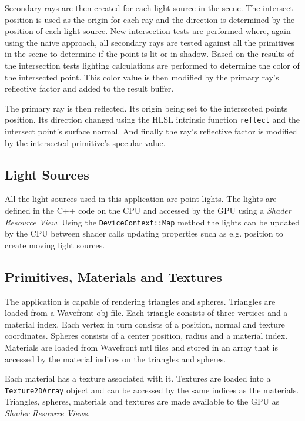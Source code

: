 \documentclass{article}
\newcommand{\code}[1]{\texttt{#1}}
\begin{document}
Secondary rays are then created for each light source in the scene. The intersect position is used as the origin for each ray and
the direction is determined by the position of each light source. New intersection tests are performed where, again using the
naive approach, all secondary rays are tested against all the primitives in the scene to determine if the point is lit or in shadow.
Based on the results of the intersection tests lighting calculations are performed to determine the color of the intersected
point. This color value is then modified by the primary ray's reflective factor and added to the result buffer.

The primary ray is then reflected. Its origin being set to the intersected points position. Its direction changed using 
the HLSL intrinsic function \code{reflect} and the intersect point's surface normal. And finally the ray's reflective factor is
modified by the intersected primitive's specular value.

\subsection{Light Sources}
All the light sources used in this application are point lights. The lights are defined in the C++ code on the CPU and
accessed by the GPU using a \textit{Shader Resource View}. Using the \code{DeviceContext::Map} method the lights can be
updated by the CPU between shader calls updating properties such as e.g. position to create moving light sources.


\subsection{Primitives, Materials and Textures}
The application is capable of rendering triangles and spheres. Triangles are loaded from a Wavefront obj file. 
Each triangle consists of three vertices and a material index. Each vertex in turn consists of a position, normal and
texture coordinates. Spheres consists of a center position, radius and a material index. Materials are loaded from
Wavefront mtl files and stored in an array that is accessed by the material indices on the triangles and spheres. 

Each material has a texture associated with it. Textures are loaded into a \code{Texture2DArray} object and can be accessed
by the same indices as the materials. Triangles, spheres, materials and textures are made available to the GPU as
\textit{Shader Resource Views}.
%
%
%
\end{document}
